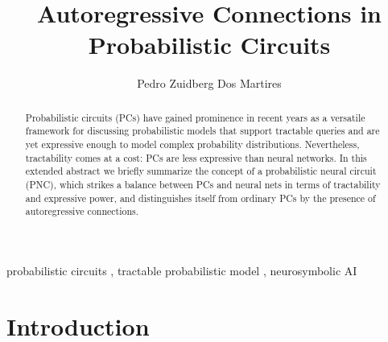\documentclass[
]{ceurart}
\begin{document}


\title{Autoregressive Connections in Probabilistic Circuits}



\author{Pedro {Zuidberg Dos Martires}}
\address{Örebro University, Sweden}




\begin{abstract}
	Probabilistic circuits (PCs) have gained prominence in recent years as a versatile framework for discussing probabilistic models that support tractable queries and are yet expressive enough to model complex probability distributions.
	Nevertheless, tractability comes at a cost: PCs are less expressive than neural networks.
	In this extended abstract we briefly summarize the concept of a probabilistic neural circuit (PNC), which strikes a balance between PCs and neural nets in terms of tractability and expressive power, and distinguishes itself from ordinary PCs by the presence of autoregressive connections.
\end{abstract}

\begin{keywords}
	probabilistic circuits \sep
	tractable probabilistic model \sep
	neurosymbolic AI
\end{keywords}

\maketitle




\section{Introduction}
\end{document}
